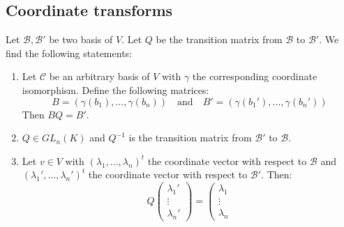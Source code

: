 	\subsection{Coordinate transforms}
        
        
        \begin{theorem}
        	\label{linalgebra:theorem:transition_matrix}
			Let $\mathcal{B}, \mathcal{B}'$ be two basis of $V$. Let $Q$ be the transition matrix from $\mathcal{B}$ to $\mathcal{B}'$. We find the following statements:
            \begin{enumerate}
				\item Let $\mathcal{C}$ be an arbitrary basis of $V$ with $\gamma$ the corresponding coordinate isomorphism. Define the following matrices:
                	\[
                		B=(\gamma(b_1), ..., \gamma(b_n))\quad\text{and}\quad B'=(\gamma(b_1'), ..., \gamma(b_n'))
                	\]
                    Then $BQ = B'$.
				\item $Q\in GL_n(K)$ and $Q^{-1}$ is the transition matrix from $\mathcal{B}'$ to $\mathcal{B}$.
                \item Let $v\in V$ with $(\lambda_1, ..., \lambda_n)^t$ the coordinate vector with respect to $\mathcal{B}$ and $(\lambda_1', ..., \lambda_n')^t$ the coordinate vector with respect to $\mathcal{B}'$. Then:
                	\[
                    	Q\left(
                        \begin{array}{c}
							\lambda_1'\\
                            \vdots\\
                            \lambda_n'
						\end{array}
                        \right)
                        =
                        \left(
                        \begin{array}{c}
							\lambda_1\\
                            \vdots\\
                            \lambda_n
						\end{array}
\]
\end{enumerate}
\end{theorem}
